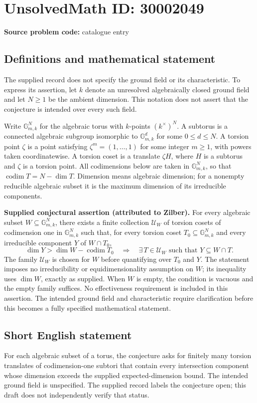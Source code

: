 \documentclass[11pt]{article}
\begin{document}
\section*{UnsolvedMath ID: 30002049}
\textbf{Source problem code:} catalogue entry
\subsection{Definitions and mathematical statement}
The supplied record does not specify the ground field or its characteristic. To express its assertion, let \(k\) denote an unresolved algebraically closed ground field and let \(N\geq 1\) be the ambient dimension. This notation does not assert that the conjecture is intended over every such field.

Write \(\mathbb G_{m,k}^{N}\) for the algebraic torus with \(k\)-points \((k^{\times})^{N}\). A subtorus is a connected algebraic subgroup isomorphic to \(\mathbb G_{m,k}^{d}\) for some \(0\leq d\leq N\). A torsion point \(\zeta\) is a point satisfying \(\zeta^{m}=(1,\ldots,1)\) for some integer \(m\geq 1\), with powers taken coordinatewise. A torsion coset is a translate \(\zeta H\), where \(H\) is a subtorus and \(\zeta\) is a torsion point. All codimensions below are taken in \(\mathbb G_{m,k}^{N}\), so that \(\operatorname{codim}T=N-\dim T\). Dimension means algebraic dimension; for a nonempty reducible algebraic subset it is the maximum dimension of its irreducible components.

\textbf{Supplied conjectural assertion (attributed to Zilber).} For every algebraic subset \(W\subseteq\mathbb G_{m,k}^{N}\), there exists a finite collection \(\mathcal U_W\) of torsion cosets of codimension one in \(\mathbb G_{m,k}^{N}\) such that, for every torsion coset \(T_0\subseteq\mathbb G_{m,k}^{N}\) and every irreducible component \(Y\) of \(W\cap T_0\),
\[
\dim Y>\dim W-\operatorname{codim}T_0
\quad\Longrightarrow\quad
\exists\,T\in\mathcal U_W\text{ such that }Y\subseteq W\cap T.
\]
The family \(\mathcal U_W\) is chosen for \(W\) before quantifying over \(T_0\) and \(Y\). The statement imposes no irreducibility or equidimensionality assumption on \(W\); its inequality uses \(\dim W\), exactly as supplied. When \(W\) is empty, the condition is vacuous and the empty family suffices. No effectiveness requirement is included in this assertion. The intended ground field and characteristic require clarification before this becomes a fully specified mathematical statement.
\subsection{Short English statement}
For each algebraic subset of a torus, the conjecture asks for finitely many torsion translates of codimension-one subtori that contain every intersection component whose dimension exceeds the supplied expected-dimension bound. The intended ground field is unspecified. The supplied record labels the conjecture open; this draft does not independently verify that status.
\end{document}
